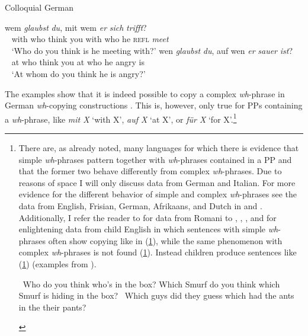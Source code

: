 \begin{exe}
\ex Colloquial German\label{whcopyinggermanb}\begin{xlist}
\ex {} {wem} {\textit{glaubst}} {\textit{du},} {mit} {wem} {\textit{er}} {\textit{sich}} {\textit{trifft}?}   \\
{\textcolor{white}{\%}with} {who} {think} {you} {with} {who} {he} {\textsc{refl}}  {\textit{meet}}\\
\trans \textcolor{white}{\%}`Who do you think is he meeting with?' \label{ex:whcopyinggermanba}
\ex {} {wen} {\textit{glaubst}} {\textit{du},} {auf} {wen} {\textit{er}} {\textit{sauer}} {\textit{ist}?}  \\
{\textcolor{white}{\%}at} {who} {think} {you} {at} {who} {he} {angry} {is} \\
\trans \textcolor{white}{\%}`At whom do you think he is angry?' \label{ex:whcopyinggermanbb}

\end{xlist}
\end{exe}

\noindent The examples show that it is indeed possible to copy a complex \textit{wh}-phrase in German \textit{wh}-copying constructions \citep{mcdaniel1986conditions, felser2004wh, nunes2004linearization, van2010complex}. This is, however, only true for PPs containing a \textit{wh}-phrase, like \textit{mit X} `with X', \textit{auf X} `at X', or \textit{für X} `for X'.\footnote{ There are, as already noted, many languages for which there is evidence that simple \textit{wh}-phrases pattern together with \textit{wh}-phrases contained in a PP and that the former two behave differently from complex \textit{wh}-phrases. Due to reasons of space I will only discuss data from German and Italian. For more evidence for the different behavior of simple and complex \textit{wh}-phrases see the data from English, Frisian, German, Afrikaans, and Dutch in \citet{van2010complex, van2012you} and \citet{felser2004wh}. Additionally, I refer the reader to \citet{mcdaniel1986conditions, mcdaniel1989partial} for data from Romani to \citet{de1990acquisition}, \citet{thornton1990adventures}, \citet{thornton1999levels}, and \citet{mcdaniel1995parameters} for enlightening data from child English in which sentences with simple \textit{wh}-phrases often show copying like in (\ref{childrensenglisha}), while the same phenomenon with complex \textit{wh}-phrases is not found (\ref{childrensenglishb}). Instead children produce sentences like (\ref{childrensenglishc}) (examples from \citealt[7]{thornton1999levels}).

\begin{exe}
\ex\label{childrensenglish}\begin{xlist}
\ex \textcolor{white}{*}Who do you think who's in the box? \label{childrensenglisha}
\ex *Which Smurf do you think which Smurf is hiding in the box? \label{childrensenglishb}
\ex \textcolor{white}{*}Which guys did they guess which had the ants in the their pants? \label{childrensenglishc}
\end{xlist}
\end{exe}



}  


